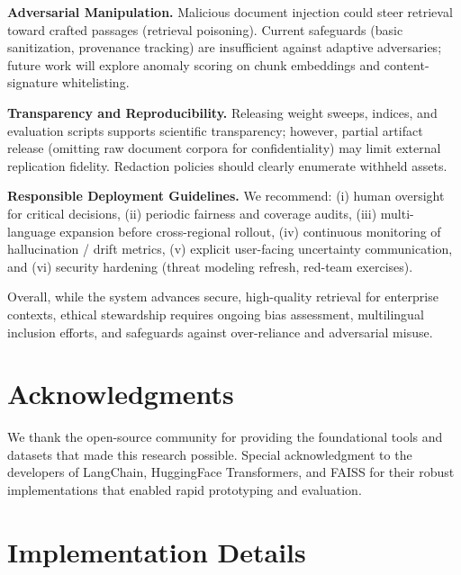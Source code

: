 \documentclass[11pt]{article}
\begin{document}
	\textbf{Adversarial Manipulation.} Malicious document injection could steer retrieval toward crafted passages (retrieval poisoning). Current safeguards (basic sanitization, provenance tracking) are insufficient against adaptive adversaries; future work will explore anomaly scoring on chunk embeddings and content-signature whitelisting.

	\textbf{Transparency and Reproducibility.} Releasing weight sweeps, indices, and evaluation scripts supports scientific transparency; however, partial artifact release (omitting raw document corpora for confidentiality) may limit external replication fidelity. Redaction policies should clearly enumerate withheld assets.

	\textbf{Responsible Deployment Guidelines.} We recommend: (i) human oversight for critical decisions, (ii) periodic fairness and coverage audits, (iii) multi-language expansion before cross-regional rollout, (iv) continuous monitoring of hallucination / drift metrics, (v) explicit user-facing uncertainty communication, and (vi) security hardening (threat modeling refresh, red-team exercises).

Overall, while the system advances secure, high-quality retrieval for enterprise contexts, ethical stewardship requires ongoing bias assessment, multilingual inclusion efforts, and safeguards against over-reliance and adversarial misuse.

\section*{Acknowledgments}

We thank the open-source community for providing the foundational tools and datasets that made this research possible. Special acknowledgment to the developers of LangChain, HuggingFace Transformers, and FAISS for their robust implementations that enabled rapid prototyping and evaluation.



\appendix

\section{Implementation Details}
\end{document}
